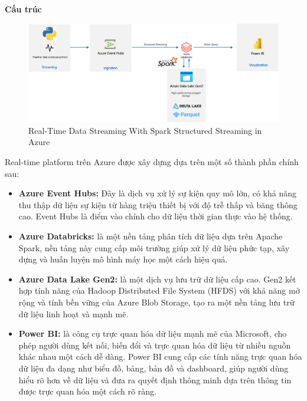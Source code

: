 \textbf{Cấu trúc}
\begin{center}
    \begin{figure}[h!]
    \begin{center}
     \includegraphics[scale=0.3]{img/realtime_architecture.png}
    \end{center}
    \caption{Real-Time Data Streaming With Spark Structured Streaming in Azure}
    \label{refhinh20}
    \end{figure}
\end{center}
Real-time platform trên Azure được xây dựng dựa trên một số thành phần chính sau:
\begin{itemize}
    \item \textbf{Azure Event Hubs:} Đây là dịch vụ xử lý sự kiện quy mô lớn, có khả năng thu thập dữ liệu sự kiện từ hàng triệu thiết bị với độ trễ thấp và băng thông cao. Event Hubs là điểm vào chính cho dữ liệu thời gian thực vào hệ thống.
    \item \textbf{Azure Databricks:} là một nền tảng phân tích dữ liệu dựa trên Apache Spark, nền tảng này cung cấp môi trường giúp xử lý dữ liệu phức tạp, xây dựng và huấn luyện mô hình máy học một cách hiệu quả.
    \item \textbf{Azure Data Lake Gen2:} là một dịch vụ lưu trữ dữ liệu cấp cao. Gen2 kết hợp tính năng của Hadoop Distributed File System (HFDS) với khả năng mở rộng và tính bền vững của Azure Blob Storage, tạo ra một nền tảng lưu trữ dữ liệu linh hoạt và mạnh mẽ.
    \item \textbf{Power BI:} là công cụ trực quan hóa dữ liệu mạnh mẽ của Microsoft, cho phép người dùng kết nối, biến đổi và trực quan hóa dữ liệu từ nhiều nguồn khác nhau một cách dễ dàng. Power BI cung cấp các tính năng trực quan hóa dữ liệu đa dạng như biểu đồ, bảng, bản đồ và dashboard, giúp người dùng hiểu rõ hơn về dữ liệu và đưa ra quyết định thông minh dựa trên thông tin được trực quan hóa một cách rõ ràng.
\end{itemize}


